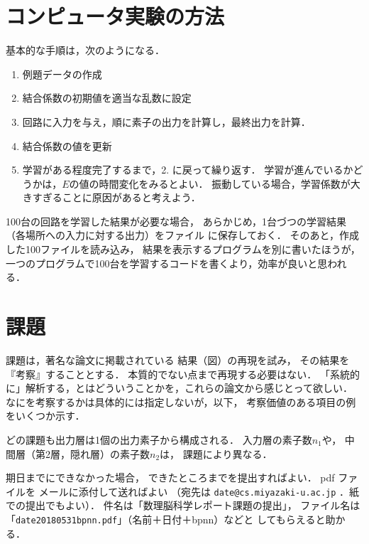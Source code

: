 \documentclass[a4paper,11pt]{jarticle}
\begin{document}
\section{コンピュータ実験の方法}

    基本的な手順は，次のようになる．
\begin{enumerate}
 \item 例題データの作成
 \item 結合係数の初期値を適当な乱数に設定
 \item 回路に入力を与え，順に素子の出力を計算し，最終出力を計算．
 \item 結合係数の値を更新
 \item 学習がある程度完了するまで，2. に戻って繰り返す．
       学習が進んでいるかどうかは，$E$の値の時間変化をみるとよい．
       振動している場合，学習係数が大きすぎることに原因があると考えよう．
\end{enumerate}

  100台の回路を学習した結果が必要な場合，
  あらかじめ，1台づつの学習結果（各場所への入力に対する出力）をファイル
  に保存しておく．
  そのあと，作成した100ファイルを読み込み，
  結果を表示するプログラムを別に書いたほうが，
  一つのプログラムで100台を学習するコードを書くより，効率が良いと思われる．
  
  
\newpage


\section{課題}
課題は，著名な論文\cite{rumelhart86b,sgeman92a}に掲載されている
結果（図）の再現を試み，
その結果を『考察』することとする．
本質的でない点まで再現する必要はない．
「系統的に」解析する，とはどういうことかを，これらの論文から感じとって欲しい．
なにを考察するかは具体的には指定しないが，以下，
考察価値のある項目の例をいくつか示す．

どの課題も出力層は1個の出力素子から構成される．
入力層の素子数$n_1$や，
中間層（第2層，隠れ層）の素子数$n_2$は，
課題により異なる．

期日までにできなかった場合，
できたところまでを提出すればよい．
pdf ファイルを
メールに添付して送ればよい
（宛先は {\small\tt date@cs.miyazaki-u.ac.jp} ．紙での提出でもよい）．
件名は「数理脳科学レポート課題の提出」，
ファイル名は 「{\small\tt date20180531bpnn.pdf}」（名前＋日付＋bpnn）などと
してもらえると助かる．
\end{document}
